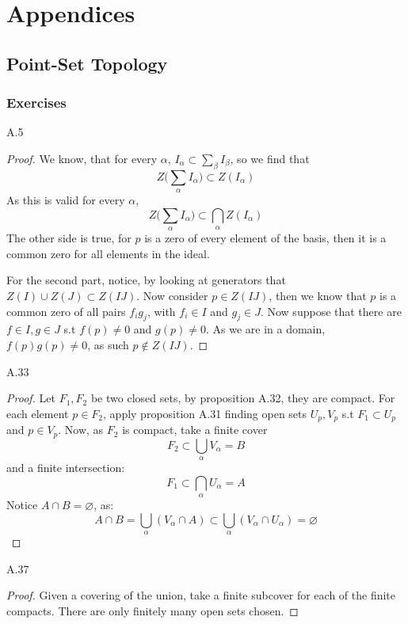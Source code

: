 \renewcommand{\thesection}{\Alph{section}}
\chapter{Appendices}
\section{Point-Set Topology}
\subsection{Exercises}

\begin{customprob}{A.5}
\end{customprob}
\begin{proof}
	We know, that for every $\alpha$, $I_\alpha \subset \sum_\beta I_\beta$, so we find that
	$$Z\bigg(\sum_\alpha I_\alpha \bigg) \subset Z(I_\alpha)$$
	As this is valid for every $\alpha$,
	$$ Z\bigg(\sum_\alpha I_\alpha \bigg) \subset \bigcap_\alpha Z(I_\alpha)$$
	The other side is true, for $p$ is a zero of every element of the basis, then it is a common zero for all elements in the ideal.

	For the second part, notice, by looking at generators that $Z(I) \cup Z(J) \subset Z(IJ)$.
	Now consider $p \in Z(IJ)$, then we know that $p$ is a common zero of all pairs $f_ig_j$, with
	$f_i \in I$ and $g_j \in J$. Now suppose that there are $f \in I, g \in J$ s.t $f(p) \neq 0$ and $g(p) \neq 0$.
	As we are in a domain, $f(p)g(p) \neq 0$, as such $p \not \in Z(IJ)$.
\end{proof}

\begin{customprob}{A.33}
\end{customprob}
\begin{proof}
	Let $F_1, F_2$ be two closed sets, by proposition A.32, they are compact. For each element $p \in F_2$, apply proposition A.31
	finding open sets $U_p,V_p$ s.t $F_1 \subset U_p$ and $p \in V_p$. Now, as $F_2$ is compact, take a finite cover
	$$F_2 \subset \bigcup_\alpha V_\alpha = B$$
	and a finite intersection:
	$$F_1 \subset \bigcap_\alpha U_\alpha = A$$
	Notice $A\cap B = \varnothing$, as:
	$$A \cap B = \bigcup_\alpha (V_\alpha \cap A) \subset \bigcup_\alpha (V_\alpha \cap U_\alpha) = \varnothing$$
\end{proof}

\begin{customprob}{A.37}
\end{customprob}
\begin{proof}
	Given a covering of the union, take a finite subcover for each of the finite compacts. There are only finitely many open sets chosen.
\end{proof}

